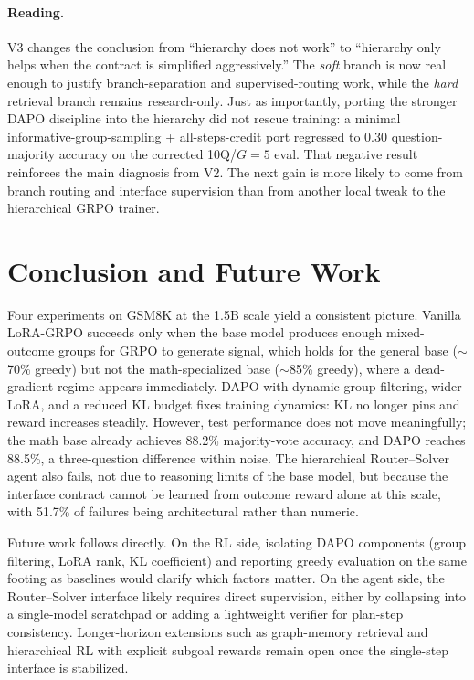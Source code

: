 \documentclass[11pt]{article}
\begin{document}
\paragraph{Reading.} V3 changes the conclusion from ``hierarchy does not work'' to ``hierarchy only helps when the contract is simplified aggressively.'' The \emph{soft} branch is now real enough to justify branch-separation and supervised-routing work, while the \emph{hard} retrieval branch remains research-only. Just as importantly, porting the stronger DAPO discipline into the hierarchy did not rescue training: a minimal informative-group-sampling + all-steps-credit port regressed to $0.30$ question-majority accuracy on the corrected 10Q/$G{=}5$ eval. That negative result reinforces the main diagnosis from V2. The next gain is more likely to come from branch routing and interface supervision than from another local tweak to the hierarchical GRPO trainer.

\section{Conclusion and Future Work}
\label{sec:conclusion}

Four experiments on GSM8K at the 1.5B scale yield a consistent picture. Vanilla LoRA-GRPO succeeds only when the base model produces enough mixed-outcome groups for GRPO to generate signal, which holds for the general base ($\sim$70\% greedy) but not the math-specialized base ($\sim$85\% greedy), where a dead-gradient regime appears immediately. DAPO with dynamic group filtering, wider LoRA, and a reduced KL budget fixes training dynamics: KL no longer pins and reward increases steadily. However, test performance does not move meaningfully; the math base already achieves 88.2\% majority-vote accuracy, and DAPO reaches 88.5\%, a three-question difference within noise. The hierarchical Router--Solver agent also fails, not due to reasoning limits of the base model, but because the interface contract cannot be learned from outcome reward alone at this scale, with 51.7\% of failures being architectural rather than numeric.

Future work follows directly. On the RL side, isolating DAPO components (group filtering, LoRA rank, KL coefficient) and reporting greedy evaluation on the same footing as baselines would clarify which factors matter. On the agent side, the Router--Solver interface likely requires direct supervision, either by collapsing into a single-model scratchpad or adding a lightweight verifier for plan-step consistency. Longer-horizon extensions such as graph-memory retrieval and hierarchical RL with explicit subgoal rewards remain open once the single-step interface is stabilized.
\end{document}
